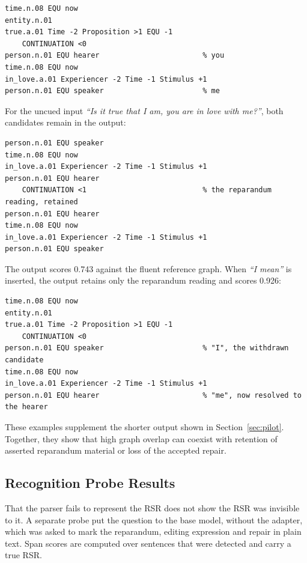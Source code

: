 \begin{lstlisting}[style=sbn]
time.n.08 EQU now
entity.n.01
true.a.01 Time -2 Proposition >1 EQU -1
    CONTINUATION <0
person.n.01 EQU hearer                        % you
time.n.08 EQU now
in_love.a.01 Experiencer -2 Time -1 Stimulus +1
person.n.01 EQU speaker                       % me
\end{lstlisting}

For the uncued input \textit{``Is it true that I am, you are in love with
me?''}, both candidates remain in the output:

\begin{lstlisting}[style=sbn]
% ... as above, up to the CONTINUATION
person.n.01 EQU speaker
time.n.08 EQU now
in_love.a.01 Experiencer -2 Time -1 Stimulus +1
person.n.01 EQU hearer
    CONTINUATION <1                           % the reparandum reading, retained
person.n.01 EQU hearer
time.n.08 EQU now
in_love.a.01 Experiencer -2 Time -1 Stimulus +1
person.n.01 EQU speaker
\end{lstlisting}

The output scores 0.743 against the fluent reference graph. When
\textit{``I mean''} is inserted, the output retains only the reparandum reading
and scores 0.926:

\begin{lstlisting}[style=sbn]
time.n.08 EQU now
entity.n.01
true.a.01 Time -2 Proposition >1 EQU -1
    CONTINUATION <0
person.n.01 EQU speaker                       % "I", the withdrawn candidate
time.n.08 EQU now
in_love.a.01 Experiencer -2 Time -1 Stimulus +1
person.n.01 EQU hearer                        % "me", now resolved to the hearer
\end{lstlisting}

These examples supplement the shorter output shown in
Section~\ref{sec:pilot}. Together, they show that high graph overlap can
coexist with retention of asserted reparandum material or loss of the accepted
repair.

\subsection{Recognition Probe Results}

That the parser fails to represent the RSR does not show the RSR was
invisible to it. A separate probe put the question to the base model, without
the adapter, which was asked to mark the reparandum, editing expression and repair in
plain text. Span scores are computed over sentences that were detected and
carry a true RSR.

